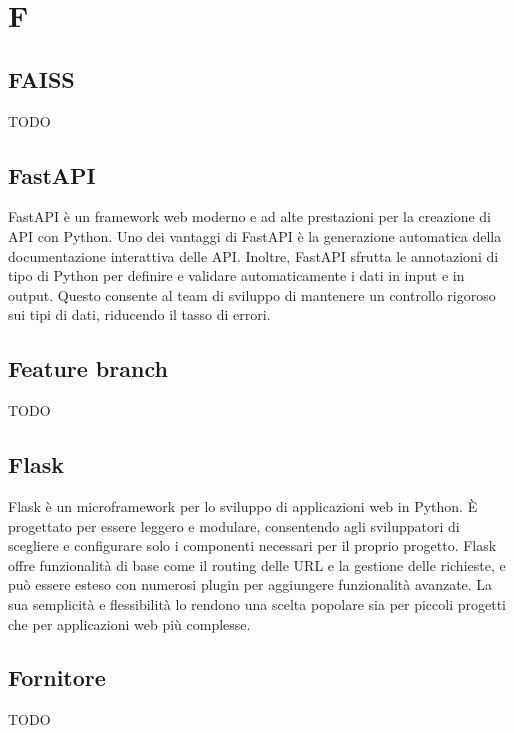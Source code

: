 \section{F}

\vspace{2em}
\subsection*{FAISS}
TODO

\vspace{2em}
\subsection*{FastAPI}
FastAPI è un framework web moderno e ad alte prestazioni per la creazione di API con Python. Uno dei vantaggi di FastAPI è la generazione automatica della documentazione interattiva delle API. Inoltre, FastAPI sfrutta le annotazioni di tipo di Python per definire e validare automaticamente i dati in input e in output. Questo consente al team di sviluppo di mantenere un controllo rigoroso sui tipi di dati, riducendo il tasso di errori.

\vspace{2em}
\subsection*{Feature branch}
TODO

\vspace{2em}
\subsection*{Flask}
Flask è un microframework per lo sviluppo di applicazioni web in Python. È progettato per essere leggero e modulare, consentendo agli sviluppatori di scegliere e configurare solo i componenti necessari per il proprio progetto. Flask offre funzionalità di base come il routing delle URL e la gestione delle richieste, e può essere esteso con numerosi plugin per aggiungere funzionalità avanzate. La sua semplicità e flessibilità lo rendono una scelta popolare sia per piccoli progetti che per applicazioni web più complesse.

\vspace{2em}
\subsection*{Fornitore}
TODO

\vspace{2em}
